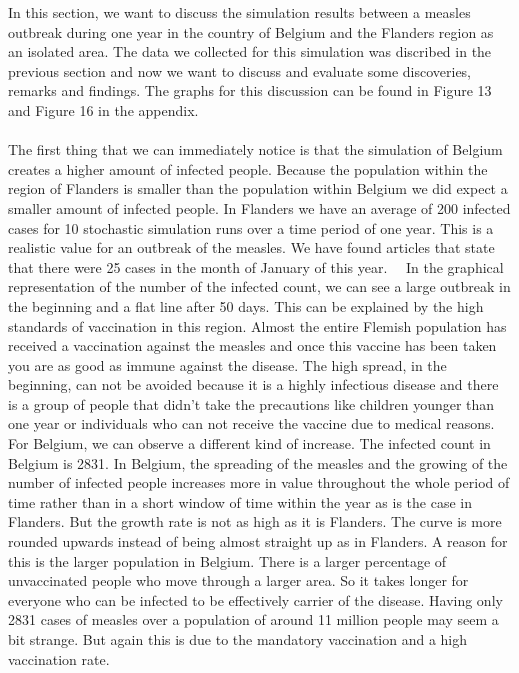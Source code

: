 \documentclass[runningheads]{llncs}
\begin{document}
	In this section, we want to discuss the simulation results between a measles outbreak during one year in the country of Belgium and the Flanders region as an isolated area. The data we collected for this simulation was discribed in the previous section and now we want to discuss and evaluate some discoveries, remarks and findings. The graphs for this discussion can be found in Figure 13 and Figure 16 in the appendix.\\
	\noindent\\
	The first thing that we can immediately notice is that the simulation of Belgium creates a higher amount of infected people. Because the population within the region of Flanders is smaller than the population within Belgium we did expect a smaller amount of infected people. In Flanders we have an average of 200 infected cases for 10 stochastic simulation runs over a time period of one year. This is a realistic value for an outbreak of the measles. We have found articles that state that there were 25 cases in the month of January of this year.~\cite{18}~\cite{13} In the graphical representation of the number of the infected count, we can see a large outbreak in the beginning and a flat line after 50 days. This can be explained by the high standards of vaccination in this region. Almost the entire Flemish population has received a vaccination against the measles and once this vaccine has been taken you are as good as immune against the disease. The high spread, in the beginning, can not be avoided because it is a highly infectious disease and there is a group of people that didn't take the precautions like children younger than one year or individuals who can not receive the vaccine due to medical reasons.~\cite{20} 
	For Belgium, we can observe a different kind of increase. The infected count in Belgium is 2831. In Belgium, the spreading of the measles and the growing of the number of infected people increases more in value throughout the whole period of time rather than in a short window of time within the year as is the case in Flanders. But the growth rate is not as high as it is Flanders. The curve is more rounded upwards instead of being almost straight up as in Flanders. A reason for this is the larger population in Belgium. There is a larger percentage of unvaccinated people who move through a larger area. So it takes longer for everyone who can be infected to be effectively carrier of the disease. Having only 2831 cases of measles over a population of around 11 million people may seem a bit strange. But again this is due to the mandatory vaccination and a high vaccination rate.\\
\end{document}
